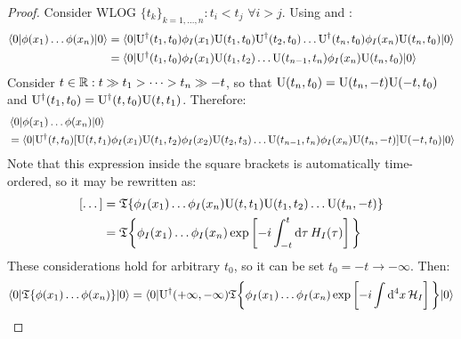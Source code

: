 \begin{proofbox}
  \begin{proof}
    Consider WLOG $ \{t_k\}_{k = 1,\dots,n} : t_i < t_j \,\,\forall i > j $. Using  and :
    \begin{equation*}
      \begin{split}
        \braket{0 | \phi(x_1) \dots \phi(x_n) | 0}
        & = \braket{0 | \mathrm{U}^\dagger(t_1,t_0) \phi_I(x_1) \mathrm{U}(t_1,t_0) \mathrm{U}^\dagger(t_2,t_0) \dots \mathrm{U}^\dagger(t_n,t_0) \phi_I(x_n) \mathrm{U}(t_n,t_0) | 0} \\
        & = \braket{0 | \mathrm{U}^\dagger(t_1,t_0) \phi_I(x_1) \mathrm{U}(t_1,t_2) \dots \mathrm{U}(t_{n-1},t_n) \phi_I(x_n) \mathrm{U}(t_n,t_0) | 0}
      \end{split}
    \end{equation*}
    Consider $ t \in \mathbb{R} : t \gg t_1 > \dots > t_n \gg -t $, so that $ \mathrm{U}(t_n,t_0) = \mathrm{U}(t_n,-t) \mathrm{U}(-t,t_0) $ and $ \mathrm{U}^\dagger(t_1,t_0) = \mathrm{U}^\dagger(t,t_0) \mathrm{U}(t,t_1) $. Therefore:
    \begin{equation*}
      \begin{split}
        & \braket{0 | \phi(x_1) \dots \phi(x_n) | 0} \\
        & = \braket{0 | \mathrm{U}^\dagger(t,t_0) [\mathrm{U}(t,t_1) \phi_I(x_1) \mathrm{U}(t_1,t_2) \phi_I(x_2) \mathrm{U}(t_2,t_3) \dots \mathrm{U}(t_{n-1},t_n) \phi_I(x_n) \mathrm{U}(t_n,-t)] \mathrm{U}(-t,t_0) | 0}
      \end{split}
    \end{equation*}
    Note that this expression inside the square brackets is automatically time-ordered, so it may be rewritten as:
    \begin{equation*}
      \begin{split}
        [\dots]
        & = \mathfrak{T}\{\phi_I(x_1) \dots \phi_I(x_n) \mathrm{U}(t,t_1) \mathrm{U}(t_1,t_2) \dots \mathrm{U}(t_n,-t)\} \\
        & = \mathfrak{T}\bigg\{ \phi_I(x_1) \dots \phi_I(x_n) \exp \left[ -i \int_{-t}^t \mathrm{d}\tau\, H_I(\tau) \right]\bigg\}
      \end{split}
    \end{equation*}
    These considerations hold for arbitrary $ t_0 $, so it can be set $ t_0 = -t \rightarrow -\infty $. Then:
    \begin{equation*}
      \braket{0 | \tempord\{\phi(x_1) \dots \phi(x_n)\} | 0} = \braket{0 | \tens{U}\dg(+\infty,-\infty) \tempord\bigg\{ \phi_I(x_1) \dots \phi_I(x_n) \exp \left[ -i \int \dd^4x\, \ham_I \right] \bigg\} | 0}

\end{equation*}
\end{proof}
\end{proofbox}
